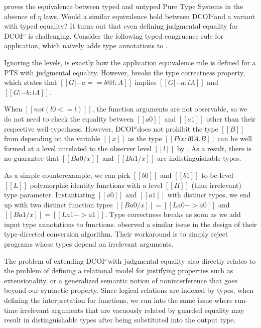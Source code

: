 \documentclass[acmsmall, screen=true, nonacm=true,
  review=\ifpublic false\else true\fi,
  anonymous=\ifanonymous true\else false\fi
]{acmart}
\makeatletter
\newcommand{\name}{\texorpdfstring{DCOI$^{\omega}$\@\xspace}{DCOI-omega}}
\makeatother
\begin{document}
\citet{siles:PTS} proves the equivalence between typed and untyped
Pure Type Systems in the absence of $\eta$ laws.
Would a similar equivalence hold between \name and a variant with typed equality?
It turns out that even defining judgmental equality for \name
is challenging. Consider the following
typed congruence rule for application, which na\"ively adds type
annotations to .

{\centering
{}\par
}

Ignoring the levels,  is exactly how the application
equivalence rule is defined for a PTS with judgmental equality. However,
 breaks the
type correctness property, which states that $[[G |- a == b @ l : A]]$
implies $[[G |- a : l A]]$ and $[[G |- b : l A]]$.

When $[[not (l0 <= l)]]$, the function
arguments are not observable, so we do not need to check the
equality between $[[a0]]$ and $[[a1]]$ other than their respective
well-typedness. However, \name does not prohibit the type $[[B]]$ from
depending on the variable $[[x]]$ as the type $[[Pi x : l0 A . B]]$
can be well formed at a level unrelated to the observer level $[[l]]$
by .
As a result, there is no guarantee that $[[B {a0 / x}]]$ and $[[B {a1
  / x}]]$ are indistinguishable types.

As a simple counterexample, we can pick $[[b0]]$ and $[[b1]]$ to be
level $[[L]]$ polymorphic identity functions with a level $[[H]]$
(thus irrelevant)
type parameter. Instantiating $[[a0]]$ and $[[a1]]$ with distinct
types, we end up with two distinct function types $[[B {a0 / x}]] = [[L
a0 -> a0]]$ and $[[B {a1 / x}]] = [[L a1 -> a1]]$. Type correctness
breaks as soon as we add input type annotations to
functions. \citet{abel:irrelevance} observed a similar issue in the
design of their type-directed conversion algorithm. Their workaround is
to simply reject programs whose types depend on irrelevant arguments.

The problem of extending \name with judgmental equality also
directly relates to the problem of defining a relational model for justifying properties
such as extensionality, or a generalized semantic notion of noninterference
that goes beyond our syntactic  property.
Since logical relations are indexed by types,
when defining the interpretation for functions, we run into the same
issue where run-time irrelevant arguments that are vacuously related by guarded
equality may result in distinguishable types after being substituted
into the output type.
\end{document}
